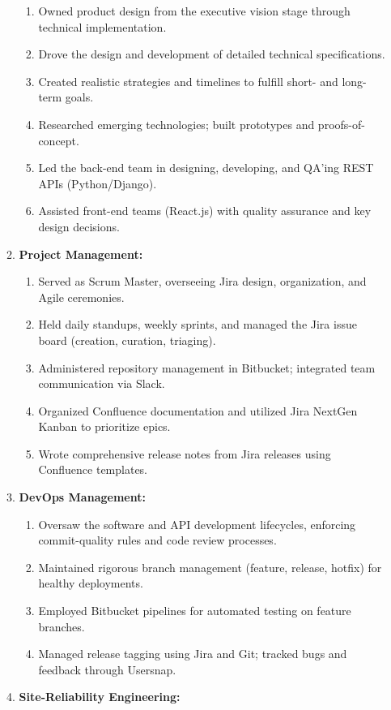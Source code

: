 \documentclass[oneside]{article}%
\begin{document}
\begin{enumerate}[]
\begin{enumerate}[]
				\begin{enumerate}[-]
					\item Owned product design from the executive vision stage through technical implementation.
					\item Drove the design and development of detailed technical specifications.
					\item Created realistic strategies and timelines to fulfill short- and long-term goals.
					\item Researched emerging technologies; built prototypes and proofs-of-concept.
					\item Led the back-end team in designing, developing, and QA’ing REST APIs (Python/Django).
					\item Assisted front-end teams (React.js) with quality assurance and key design decisions.
				\end{enumerate}
			\item \textbf{Project Management:}
				\begin{enumerate}[-]
					\item Served as Scrum Master, overseeing Jira design, organization, and Agile ceremonies.
					\item Held daily standups, weekly sprints, and managed the Jira issue board (creation, curation, triaging).
					\item Administered repository management in Bitbucket; integrated team communication via Slack.
      					\item Organized Confluence documentation and utilized Jira NextGen Kanban to prioritize epics.
      					\item Wrote comprehensive release notes from Jira releases using Confluence templates.
				\end{enumerate}
			\item \textbf{DevOps Management:}
				\begin{enumerate}[-]
					\item Oversaw the software and API development lifecycles, enforcing commit-quality rules and code review processes.
					\item Maintained rigorous branch management (feature, release, hotfix) for healthy deployments.
					\item Employed Bitbucket pipelines for automated testing on feature branches.
					\item Managed release tagging using Jira and Git; tracked bugs and feedback through Usersnap.
				\end{enumerate}
			\item \textbf{Site-Reliability Engineering:}

\end{enumerate}
\end{enumerate}
\end{document}
